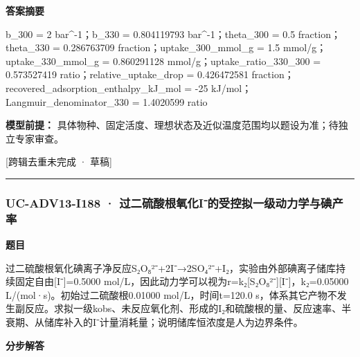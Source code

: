 \documentclass[UTF8,11pt,a4paper]{ctexart}
\begin{document}
\noindent\textbf{答案摘要}\par
b\_300 = 2 bar\textasciicircum{}-1；b\_330 = 0.804119793 bar\textasciicircum{}-1；theta\_300 = 0.5 fraction；theta\_330 = 0.286763709 fraction；uptake\_300\_mmol\_g = 1.5 mmol/g；uptake\_330\_mmol\_g = 0.860291128 mmol/g；uptake\_ratio\_330\_300 = 0.573527419 ratio；relative\_uptake\_drop = 0.426472581 fraction；recovered\_adsorption\_enthalpy\_kJ\_mol = -25 kJ/mol；Langmuir\_denominator\_330 = 1.4020599 ratio\par
\noindent\textbf{模型前提：}
具体物种、固定活度、理想状态及近似温度范围均以题设为准；待独立专家审查。\par
\noindent\textcolor{red!65!black}{[跨辑去重未完成 · 草稿]} \par
\medskip\hrule\medskip
{}
\subsubsection*{UC-ADV13-I188 · 过二硫酸根氧化I⁻的受控拟一级动力学与碘产率}
\noindent\textbf{题目}\par
过二硫酸根氧化碘离子净反应S₂O₈²⁻+2I⁻→2SO₄²⁻+I₂，实验由外部碘离子储库持续固定自由[I⁻]=0.5000 mol/L，因此动力学可以视为r=k₂[S₂O₈²⁻][I⁻]，k₂=0.05000 L/(mol·s)。初始过二硫酸根0.01000 mol/L，时间t=120.0 s，体系其它产物不发生副反应。求拟一级kobs、未反应氧化剂、形成的I₂和硫酸根的量、反应速率、半衰期、从储库补入的I⁻计量消耗量；说明储库恒浓度是人为边界条件。\par
\medskip\noindent\textbf{分步解答}
\end{document}
